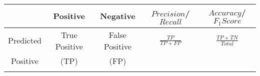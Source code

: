 \documentclass[11pt,]{article}
\begin{document}
\begin{longtable}[]{@{}ccccc@{}}
\toprule
\begin{minipage}[b]{0.17\columnwidth}\centering
\strut
\end{minipage} & \begin{minipage}[b]{0.17\columnwidth}\centering
Positive\strut
\end{minipage} & \begin{minipage}[b]{0.17\columnwidth}\centering
Negative\strut
\end{minipage} & \begin{minipage}[b]{0.17\columnwidth}\centering
\(Precision\)/\(Recall\)\strut
\end{minipage} & \begin{minipage}[b]{0.17\columnwidth}\centering
\(Accuracy\)/\(F_{1} Score\)\strut
\end{minipage}\tabularnewline
\midrule
\endhead
\begin{minipage}[t]{0.17\columnwidth}\centering
Predicted\strut
\end{minipage} & \begin{minipage}[t]{0.17\columnwidth}\centering
True Positive\strut
\end{minipage} & \begin{minipage}[t]{0.17\columnwidth}\centering
False Positive\strut
\end{minipage} & \begin{minipage}[t]{0.17\columnwidth}\centering
\(\frac{TP}{TP + FP}\)\strut
\end{minipage} & \begin{minipage}[t]{0.17\columnwidth}\centering
\(\frac{TP + TN}{Total}\)\strut
\end{minipage}\tabularnewline
\begin{minipage}[t]{0.17\columnwidth}\centering
Positive\strut
\end{minipage} & \begin{minipage}[t]{0.17\columnwidth}\centering
(TP)\strut
\end{minipage} & \begin{minipage}[t]{0.17\columnwidth}\centering
(FP)\strut
\end{minipage} & \begin{minipage}[t]{0.17\columnwidth}\centering
\strut
\end{minipage} & \begin{minipage}[t]{0.17\columnwidth}\centering
\strut
\end{minipage}\tabularnewline
\begin{minipage}[t]{0.17\columnwidth}\centering

\end{minipage}
\end{longtable}
\end{document}

